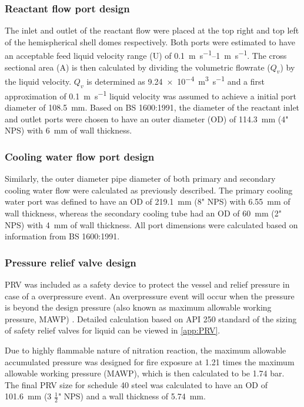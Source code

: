 \subsubsection{Reactant flow port design}
The inlet and outlet of the reactant flow were placed at the top right and top left of the hemispherical shell domes respectively. Both ports were estimated to have an acceptable feed liquid velocity range (U) of \SIrange{0.1}{1}{\m\per\s}. The cross sectional area (A) is then calculated by dividing the volumetric flowrate ($Q_v$) by the liquid velocity. $Q_v$ is determined as \SI{9.24e-4}{\cubic\m\per\s} and a first approximation of \SI{0.1}{\m\per\s} liquid velocity was assumed to achieve a initial port diameter of \SI{108.5}{\milli \metre}. Based on BS 1600:1991, the diameter of the reactant inlet and outlet ports were chosen to have an outer diameter (OD) of \SI{114.3}{\milli \metre} (4" NPS) with \SI{6}{\milli \metre} of wall thickness. 

\subsubsection{Cooling water flow port design}
Similarly, the outer diameter pipe diameter of both primary and secondary cooling water flow were calculated as previously described. The primary cooling water port was defined to have an OD of \SI{219.1}{\milli \metre} (8" NPS) with \SI{6.55}{\milli \metre} of wall thickness, whereas the secondary cooling tube had an OD of \SI{60}{\milli \metre} (2" NPS) with \SI{4}{\milli \metre} of wall thickness. All port dimensions were calculated based on information from BS 1600:1991. 

\subsubsection{Pressure relief valve design}
PRV was included as a safety device to protect the vessel and relief pressure in case of a overpressure event. An overpressure event will occur when the pressure is beyond the design pressure (also known as maximum allowable working pressure, MAWP) \cite{marsha_lecture_nodate}. Detailed calculation based on API 250 standard \cite{api_standard_520_sizing_2013} of the sizing of safety relief valves for liquid can be viewed in \ref{app:PRV}.

Due to highly flammable nature of nitration reaction, the maximum allowable accumulated pressure was designed for fire exposure at 1.21 times the maximum allowable working pressure (MAWP), which is then calculated to be 1.74 bar. The final PRV size for schedule 40 steel was calculated to have an OD of \SI{101.6}{\milli \metre} (3 $\frac{1}{2}$" NPS) and a wall thickness of \SI{5.74}{\milli \metre}.

